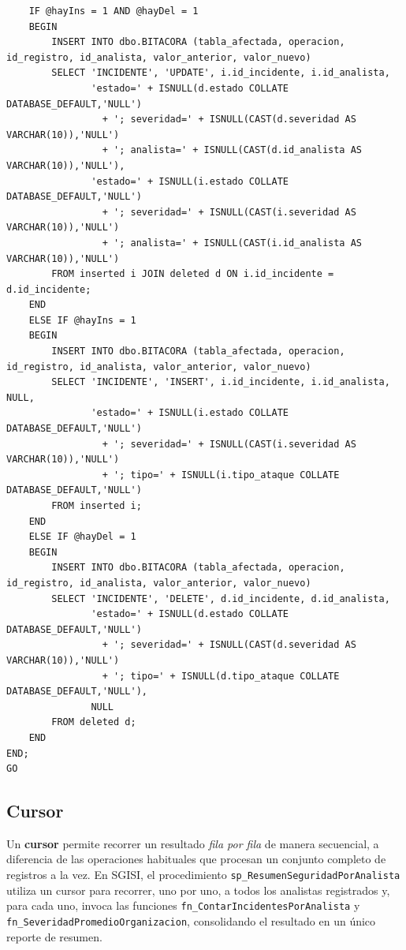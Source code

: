 \documentclass[11pt,a4paper]{article}
\begin{document}
\begin{lstlisting}
    IF @hayIns = 1 AND @hayDel = 1
    BEGIN
        INSERT INTO dbo.BITACORA (tabla_afectada, operacion, id_registro, id_analista, valor_anterior, valor_nuevo)
        SELECT 'INCIDENTE', 'UPDATE', i.id_incidente, i.id_analista,
               'estado=' + ISNULL(d.estado COLLATE DATABASE_DEFAULT,'NULL')
                 + '; severidad=' + ISNULL(CAST(d.severidad AS VARCHAR(10)),'NULL')
                 + '; analista=' + ISNULL(CAST(d.id_analista AS VARCHAR(10)),'NULL'),
               'estado=' + ISNULL(i.estado COLLATE DATABASE_DEFAULT,'NULL')
                 + '; severidad=' + ISNULL(CAST(i.severidad AS VARCHAR(10)),'NULL')
                 + '; analista=' + ISNULL(CAST(i.id_analista AS VARCHAR(10)),'NULL')
        FROM inserted i JOIN deleted d ON i.id_incidente = d.id_incidente;
    END
    ELSE IF @hayIns = 1
    BEGIN
        INSERT INTO dbo.BITACORA (tabla_afectada, operacion, id_registro, id_analista, valor_anterior, valor_nuevo)
        SELECT 'INCIDENTE', 'INSERT', i.id_incidente, i.id_analista, NULL,
               'estado=' + ISNULL(i.estado COLLATE DATABASE_DEFAULT,'NULL')
                 + '; severidad=' + ISNULL(CAST(i.severidad AS VARCHAR(10)),'NULL')
                 + '; tipo=' + ISNULL(i.tipo_ataque COLLATE DATABASE_DEFAULT,'NULL')
        FROM inserted i;
    END
    ELSE IF @hayDel = 1
    BEGIN
        INSERT INTO dbo.BITACORA (tabla_afectada, operacion, id_registro, id_analista, valor_anterior, valor_nuevo)
        SELECT 'INCIDENTE', 'DELETE', d.id_incidente, d.id_analista,
               'estado=' + ISNULL(d.estado COLLATE DATABASE_DEFAULT,'NULL')
                 + '; severidad=' + ISNULL(CAST(d.severidad AS VARCHAR(10)),'NULL')
                 + '; tipo=' + ISNULL(d.tipo_ataque COLLATE DATABASE_DEFAULT,'NULL'),
               NULL
        FROM deleted d;
    END
END;
GO
\end{lstlisting}

\subsection{Cursor}
\label{sec:cursor}

Un \textbf{cursor} permite recorrer un resultado \emph{fila por fila} de manera
secuencial, a diferencia de las operaciones habituales que procesan un conjunto
completo de registros a la vez. En SGISI, el procedimiento
\texttt{sp\_ResumenSeguridadPorAnalista} utiliza un cursor para recorrer, uno por
uno, a todos los analistas registrados y, para cada uno, invoca las funciones
\texttt{fn\_ContarIncidentesPorAnalista} y \texttt{fn\_SeveridadPromedioOrganizacion},
consolidando el resultado en un único reporte de resumen.
\end{document}
